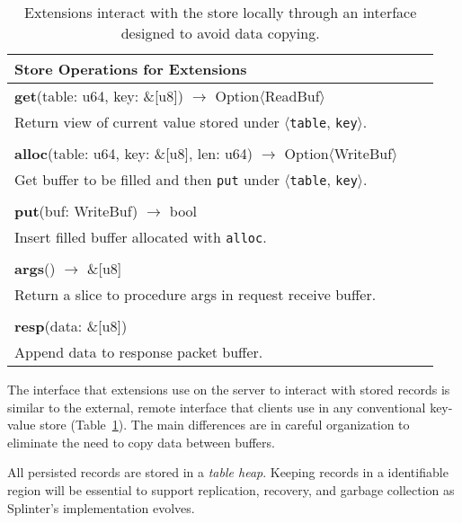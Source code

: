 \begin{table}[t]
\caption{Extensions interact with the store locally through an interface designed to
  avoid data copying.}
\centering
\begin{tabular}[]{l c c}
\toprule
\textbf{Store Operations for Extensions} \\
\midrule
\textbf{get}(table: u64, key: \&[u8]) $\rightarrow$ Option$\langle$ReadBuf$\rangle$ \\
  \hspace{1em} Return view of current value stored under $\langle$\texttt{table}, \texttt{key}$\rangle$. \\
  \\
\textbf{alloc}(table: u64, key: \&[u8], len: u64) $\rightarrow$ Option$\langle$WriteBuf$\rangle$ \\
  \hspace{1em} Get buffer to be filled and then \texttt{put} under $\langle$\texttt{table}, \texttt{key}$\rangle$. \\
  \\
\textbf{put}(buf: WriteBuf) $\rightarrow$ bool \\
  \hspace{1em} Insert filled buffer allocated with \texttt{alloc}. \\
  \\
\textbf{args}() $\rightarrow$ \&[u8] \\
  \hspace{1em} Return a slice to procedure args in request receive buffer. \\
  \\
\textbf{resp}(data: \&[u8]) \\
  \hspace{1em} Append data to response packet buffer. \\
\bottomrule
\end{tabular}
\label{table:db_interface}
\end{table}

The interface that extensions use on the server to interact with stored records is similar to
  the external, remote interface that clients use in any conventional key-value
  store (Table~\ref{table:db_interface}).
The main differences are in careful organization to eliminate the need to copy
  data between buffers.

All persisted records are stored in a \emph{table heap}.
Keeping records in a identifiable region will be essential to support
  replication, recovery, and garbage collection as Splinter's implementation
  evolves.

